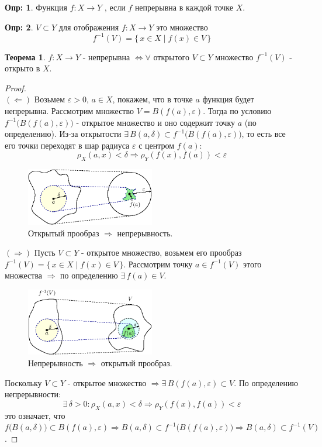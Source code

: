 \documentclass[12pt]{article}
\newcommand{\VE}{\varepsilon}
\theoremstyle{definition}
\newtheorem{defn}{Опр:}
\newtheorem{theorem}{Теорема}
\begin{document}
\begin{defn}
	Функция $f \colon X \to Y$ , если $f$ непрерывна в каждой точке $X$.
\end{defn}
\begin{defn}
	 $V \subset Y$ для отображения $f\colon X \to Y$ это множество 
	$$
		f^{-1}(V) = \{\,x \in X \mid f(x) \in V \,\}
	$$
\end{defn}
\begin{theorem}
	$f \colon X \to Y$ - непрерывна $\Leftrightarrow \forall$ открытого $V \subset Y$ множество $f^{-1}(V)$ - открыто в $X$.
\end{theorem}
\begin{proof}\hfill\\
	$(\Leftarrow)$ Возьмем $\VE > 0, \, a \in X$, покажем, что в точке $a$ функция будет непрерывна. Рассмотрим множество $V = B(f(a),\VE)$. Тогда по условию $f^{-1}\big(B(f(a),\VE)\big)$ - открытое множество и оно содержит точку $a$ (по определению). Из-за открытости $\exists \, B(a,\delta) \subset f^{-1}\big(B(f(a),\VE)\big)$, то есть все его точки переходят в шар радиуса $\VE$ с центром $f(a)$:
	$$
		\rho_X(a,x) < \delta \Rightarrow \rho_Y(f(x),f(a)) < \VE
	$$
	\begin{figure}[H]
		\centering
		\includegraphics[width=0.5\textwidth]{10_3.eps}
		\caption{Открытый прообраз $\Rightarrow$ непрерывность.}
		\label{10_3}
	\end{figure}

	$(\Rightarrow)$	Пусть $V \subset Y$ - открытое множество, возьмем его прообраз $f^{-1}(V) = \{\,x \in X \mid f(x) \in V \,\}$. Рассмотрим точку $a \in f^{-1}(V)$ этого множества  $\Rightarrow$ по определению $\exists \, f(a) \in V$.
	\begin{figure}[H]
		\centering
		\includegraphics[width=0.5\textwidth]{10_4.eps}
		\caption{Непрерывность $\Rightarrow$ открытый прообраз.}
		\label{10_4}
	\end{figure}
	Поскольку $V \subset Y$ - открытое множество $\Rightarrow \exists \, B(f(a),\VE) \subset V$. По определению непрерывности: 
	$$
		\exists \, \delta > 0 \colon \rho_X(a,x) < \delta \Rightarrow \rho_Y(f(x),f(a)) < \VE
	$$
	это означает, что $f\big(B(a,\delta)\big) \subset B(f(a),\VE) \Rightarrow B(a,\delta) \subset f^{-1}\big(B(f(a),\VE)\big) \Rightarrow B(a,\delta)\subset f^{-1}(V)$. 
\end{proof}
\end{document}
